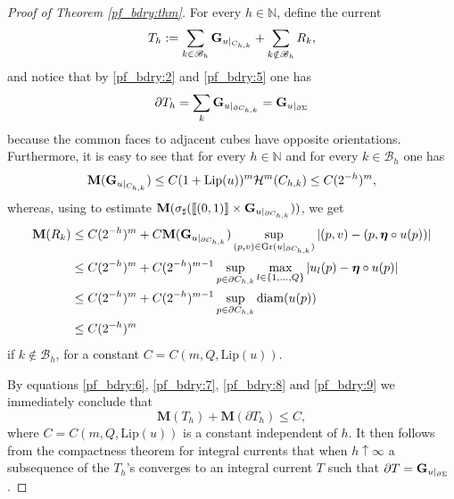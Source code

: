 \documentclass[a4paper,11pt,reqno]{amsart}
\theoremstyle{definition}
\numberwithin{equation}{section}
\numberwithin{subsection}{section}
\newcommand{\N}{\mathbb{N}}
\newcommand{\M}{\mathbf{M}}
\newcommand{\Lip}{\mathrm{Lip}}
\newcommand{\Ha}{\mathcal{H}}
\newcommand{\bfeta}{\boldsymbol{\eta}}
\begin{document}
\begin{proof}[Proof of Theorem \ref{pf_bdry:thm}]
For every $h \in \N$, define the current
\begin{equation} \label{pf_bdry:6}
T_{h} := \sum_{k \in \mathscr{B}_{h}} {\bf G}_{u|_{C_{h,k}}} + \sum_{k \notin \mathscr{B}_{h}} R_{k}, 
\end{equation}
and notice that by \eqref{pf_bdry:2} and \eqref{pf_bdry:5} one has
\begin{equation} \label{pf_bdry:7}
\partial T_{h} = \sum_{k} {\bf G}_{u|_{\partial C_{h,k}}} = {\bf G}_{u|_{\partial \Sigma}}
\end{equation}
because the common faces to adjacent cubes have opposite orientations. Furthermore, it is easy to see that for every $h \in \N$ and for every $k \in \mathscr{B}_{h}$ one has
\begin{equation} \label{pf_bdry:8}
\M({\bf G}_{u|_{C_{h,k}}}) \leq C (1 + \Lip(u))^{m} \Ha^{m}(C_{h,k}) \leq C (2^{-h})^{m}, 
\end{equation}
whereas, using \cite[(26.23)]{Sim83} to estimate $\M(\sigma_{\sharp}(\llbracket (0,1) \rrbracket \times {\bf G}_{u|_{\partial C_{h,k}}}))$, we get
\begin{equation} \label{pf_bdry:9}
\begin{split}
\M(R_{k}) &\leq C (2^{-h})^{m} + C \M({\bf G}_{u|_{\partial C_{h,k}}}) \sup_{( p,v ) \in {\rm Gr}(u|_{\partial C_{h,k}})} |(p,v) - (p, \bfeta \circ u(p))| \\
&\leq C (2^{-h})^{m} + C (2^{-h})^{m-1} \sup_{p \in \partial C_{h,k}} \max_{l \in \{1,\dots,Q\}} |u_{l}(p) - \bfeta \circ u(p)| \\
&\leq C (2^{-h})^{m} + C (2^{-h})^{m-1} \sup_{p \in \partial C_{h,k}} {\rm diam}(u(p)) \\
&\leq C (2^{-h})^{m}
\end{split} 
\end{equation}
if $k \notin \mathscr{B}_{h}$, for a constant $C = C(m,Q, \Lip(u))$.

By equations \eqref{pf_bdry:6}, \eqref{pf_bdry:7}, \eqref{pf_bdry:8} and \eqref{pf_bdry:9} we immediately conclude that
\begin{equation} \label{pf_bdry:10}
\M(T_{h}) + \M(\partial T_{h}) \leq C,
\end{equation}
where $C = C(m,Q,\Lip(u))$ is a constant independent of $h$. It then follows from the compactness theorem for integral currents \cite[Theorem 27.3]{Sim83} that when $h \uparrow \infty$ a subsequence of the $T_{h}$'s converges to an integral current $T$ such that $\partial T = {\bf G}_{u|_{\partial \Sigma}}$.


\end{proof}
\end{document}
